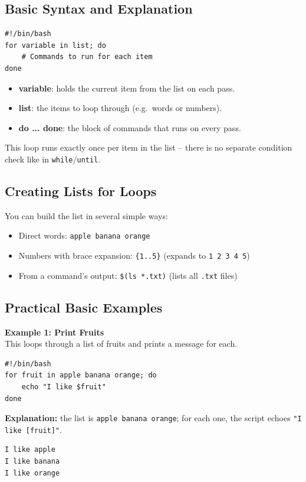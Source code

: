 \subsection{Basic Syntax and Explanation}
\begin{lstlisting}[language=Terminal]
#!/bin/bash
for variable in list; do
    # Commands to run for each item
done
\end{lstlisting}
\begin{itemize}
    \item \textbf{variable}: holds the current item from the list on each pass.
    \item \textbf{list}: the items to loop through (e.g.\ words or numbers).
    \item \textbf{do ... done}: the block of commands that runs on every pass.
\end{itemize}
This loop runs exactly once per item in the list -- there is no separate condition check like in \texttt{while}/\texttt{until}.

\subsection{Creating Lists for Loops}
You can build the list in several simple ways:
\begin{itemize}
    \item Direct words: \texttt{apple banana orange}
    \item Numbers with brace expansion: \texttt{\{1..5\}} (expands to \texttt{1 2 3 4 5})
    \item From a command's output: \texttt{\$(ls *.txt)} (lists all \texttt{.txt} files)
\end{itemize}

\subsection{Practical Basic Examples}

\textbf{Example 1: Print Fruits}\\
This loops through a list of fruits and prints a message for each.
\begin{lstlisting}[language=Terminal]
#!/bin/bash
for fruit in apple banana orange; do
    echo "I like $fruit"
done
\end{lstlisting}
\textbf{Explanation:} the list is \texttt{apple banana orange}; for each one, the script echoes \texttt{"I like [fruit]"}.
\begin{lstlisting}[language=Terminal]
I like apple
I like banana
I like orange
\end{lstlisting}

